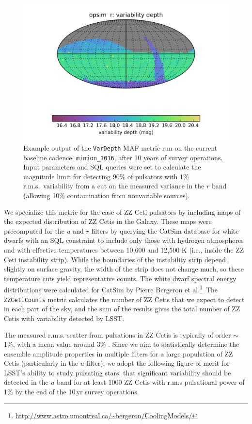 \begin{figure}
  \centering
  \includegraphics[width=0.76\columnwidth]{figs/vardepth.png}
  \caption{Example output of the {\tt VarDepth} MAF metric run on the
  current baseline cadence, {\tt minion\_1016}, after 10 years of survey
  operations. Input parameters and SQL queries were set to calculate the
  magnitude limit for detecting 90\% of pulsators with 1\% r.m.s.\
  variability from a cut on the measured variance in the $r$ band
  (allowing 10\% contamination from nonvariable sources).}
  \label{fig:vardepth}
\end{figure}


We specialize this metric for the case of ZZ Ceti pulsators by including
maps of the expected distribution of ZZ Cetis in the Galaxy. These maps
were precomputed for the $u$ and $r$ filters by querying the CatSim
database for white dwarfs with an SQL constraint to include only those
with hydrogen atmospheres and with effective temperatures between 10,600
and 12,500 K (i.e., inside the ZZ Ceti instability strip).  While the
boundaries of the instability strip depend slightly on surface gravity,
the width of the strip does not change much, so these temperature cuts
yield representative counts.  The white dwarf spectral energy
distributions were calculated for CatSim by Pierre Bergeron et
al.\footnote{\url{http://www.astro.umontreal.ca/~bergeron/CoolingModels/}}\
The {\tt ZZCetiCounts} metric calculates the number of ZZ Cetis that we
expect to detect in each part of the sky, and the sum of the results
gives the total number of ZZ Cetis with variability detected by LSST.

The measured r.m.s. scatter from pulsations in ZZ Cetis is typically of
order $\sim$1\%, with a mean value around 3\%
\citep{2006ApJ...640..956M}.  Since we aim to statistically determine
the ensemble amplitude properties in multiple filters for a large
population of ZZ Cetis (particularly in the $u$ filter), we adopt the
following figure of merit for LSST's ability to study pulsating stars:
that significant variability should be detected in the $u$ band for at
least 1000 ZZ Cetis with r.m.s pulsational power of 1\% by the end of
the 10\,yr survey operations.


